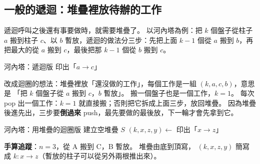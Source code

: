 \subsection{一般的遞迴：堆疊裡放待辦的工作}

遞迴呼叫之後還有事要做時，就需要堆疊了。 以河內塔為例：把 $k$ 個盤子從柱子
$a$ 搬到柱子 $c$、以 $b$ 暫放，遞迴的做法分三步：先把上面 $k - 1$ 個從 $a$ 搬到
$b$，再把最大的從 $a$ 搬到 $c$，最後把那 $k - 1$ 個從 $b$ 搬到 $c$。

\begin{pseudo}[label=alg:sq-hanoi, unbreakable]{河內塔：遞迴版}
 
        \State \Return
    \EndIf
    \State {}
    \State 印出「$a \to c$」
    \State {}
\EndProcedure
\end{pseudo}

改成迴圈的想法：堆疊裡放「還沒做的工作」，每個工作是一組 $(k, a, c, b)$，意思是
「把 $k$ 個盤子從 $a$ 搬到 $c$，$b$ 暫放」。 搬一個盤子也是一個工作，$k = 1$。
每次 pop 出一個工作：$k = 1$ 就直接搬；否則把它拆成上面三步，放回堆疊。 因為堆疊
後進先出，三步要\textbf{倒過來} push，最先要做的最後放，下一輪才會先拿到它。

\begin{pseudo}[label=alg:sq-hanoi-iter, unbreakable]{河內塔：用堆疊的迴圈版}
    \State 建立空堆疊 $S$
    \State {}
        \State $(k, x, z, y) \gets$ 
            \State 印出「$x \to z$」
        \Else
            \State {} 
            \State {} 
            \State {} 
        \EndIf
    \EndWhile
\EndProcedure
\end{pseudo}

\textbf{手算追蹤}：$n = 3$，從 A 搬到 C，B 暫放。 堆疊由底到頂寫，
$(k, x, z, y)$ 簡寫成 $k{:}x{\to}z$（暫放的柱子可以從另外兩根推出來）。

